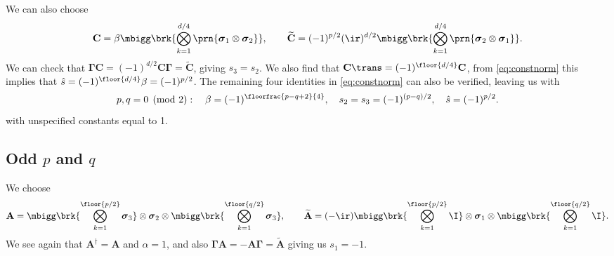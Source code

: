 \documentclass[11pt]{article}
\newcommand{\Gammab}{\boldsymbol{\Gamma}}
\newcommand{\A}{\mathbf{A}}
\renewcommand{\C}{\mathbf{C}}
\newcommand{\At}{\widetilde{\A}}
\newcommand{\Ct}{\widetilde{\C}}
\newcommand{\sigmab}{\boldsymbol{\sigma}}
\begin{document}
We can also choose
%
\begin{equation*}
  \C =  \beta \mbigg\brk{\bigotimes_{k=1}^{d/4} \prn{\sigmab_1 \otimes \sigmab_2}},
  \qquad
  \Ct = (-1)^{p/2} (\ir)^{d/2}
        \mbigg\brk{\bigotimes_{k=1}^{d/4} \prn{\sigmab_2 \otimes \sigmab_1}}.
\end{equation*}
%
We can check that $\Gammab \C = (-1)^{d/2}\C \Gammab = \Ct$, giving $s_3 = s_2$.
We also find that $\C\trans = (-1)^{\floor{d/4}} \C$, from \cref{eq:constnorm} this implies that
\( \hat{s} = (-1)^{\floor{d/4}} \beta = (-1)^{p/2} \).
The remaining four identities in \cref{eq:constnorm} can also be verified, leaving us with
%
\begin{equation}\label{eq:consteveneven}
  p, q = 0 \pmod 2 : \quad
  \beta = (-1)^{\floorfrac{p-q+2}{4}}, \quad
  s_2 = s_3 = (-1)^{(p-q)/2}, \quad
  \hat{s} = (-1)^{p/2}.
\end{equation}
%
with unspecified constants equal to 1.


\subsection{Odd \texorpdfstring{$p$ and $q$}{p and q}}\label{sec:oddodd}

We choose
%
\begin{equation*}
  \A =  \mbigg\brk{\bigotimes_{k=1}^{\floor{p/2}} \sigmab_3}
        \otimes \sigmab_2
        \otimes \mbigg\brk{\bigotimes_{k=1}^{\floor{q/2}} \sigmab_3},
  \qquad
  \At = (-\ir)
        \mbigg\brk{\bigotimes_{k=1}^{\floor{p/2}} \I}
        \otimes \sigmab_1
        \otimes \mbigg\brk{\bigotimes_{k=1}^{\floor{q/2}} \I}.
\end{equation*}
%
We see again that $\A^\dag = \A$ and $\alpha=1$, and also $\Gammab \A = - \A \Gammab =  \At$ giving us $s_1 = -1$.
\end{document}
